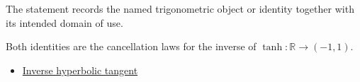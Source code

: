 \begin{remark*}[Interpretation]
The statement records the named trigonometric object or identity together with
its intended domain of use.
\end{remark*}

\begin{remark*}[Proof]
Both identities are the cancellation laws for the inverse of
$\tanh:\mathbb{R}\to(-1,1)$.
\end{remark*}
\begin{dependencies}
\begin{itemize}
  \item \hyperref[def:inverse-hyperbolic-tangent]{Inverse hyperbolic tangent}
\end{itemize}
\end{dependencies}

